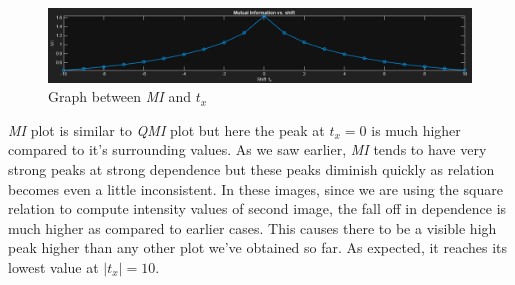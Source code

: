 \documentclass{report}
\begin{document}
\begin{figure}[h]
    \centering
    \includegraphics[width=\textwidth]{q4_2_mi.png}
    \caption{Graph between \textit{MI} and $t_x$}
\end{figure}

\textit{MI} plot is similar to \textit{QMI} plot but here the peak at $t_x = 0$ is much higher compared to it's surrounding values. As we saw earlier, \textit{MI} tends to have very strong peaks at strong dependence but these peaks diminish quickly as relation becomes even a little inconsistent. In these images, since we are using the square relation to compute intensity values of second image, the fall off in dependence is much higher as compared to earlier cases. This causes there to be a visible high peak higher than any other plot we've obtained so far. As expected, it reaches its lowest value at $|t_x| = 10$.
\end{document}
